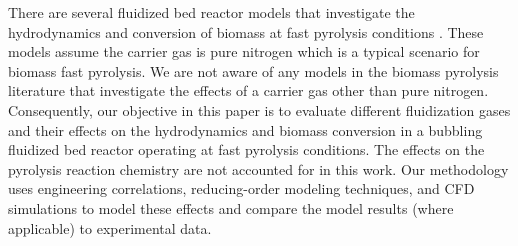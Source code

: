 There are several fluidized bed reactor models that investigate the hydrodynamics and conversion of biomass at fast pyrolysis conditions \cite{Papadikis-2009, Papadikis-2010, Mellin-2014, Xiong-2016, Xue-2011}. These models assume the carrier gas is pure nitrogen which is a typical scenario for biomass fast pyrolysis. We are not aware of any models in the biomass pyrolysis literature that investigate the effects of a carrier gas other than pure nitrogen. Consequently, our objective in this paper is to evaluate different fluidization gases and their effects on the hydrodynamics and biomass conversion in a bubbling fluidized bed reactor operating at fast pyrolysis conditions. The effects on the pyrolysis reaction chemistry are not accounted for in this work. Our methodology uses engineering correlations, reducing-order modeling techniques, and CFD simulations to model these effects and compare the model results (where applicable) to experimental data.
